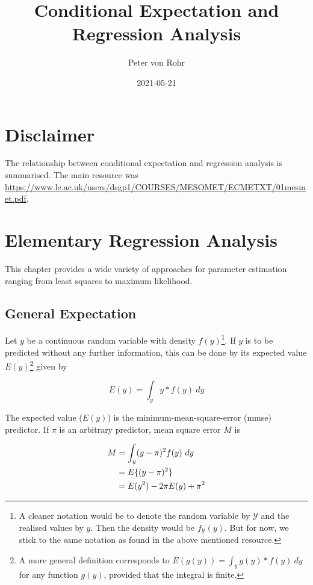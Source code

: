 \documentclass[]{tufte-handout}
\title{Conditional Expectation and Regression Analysis}
\author{Peter von Rohr}
\date{2021-05-21}
\begin{document}
\maketitle



{
\setcounter{tocdepth}{2}
\tableofcontents
}

\hypertarget{disclaimer}{%
\section{Disclaimer}\label{disclaimer}}

The relationship between conditional expectation and regression analysis is summarised. The main resource was \url{https://www.le.ac.uk/users/dsgp1/COURSES/MESOMET/ECMETXT/01mesmet.pdf}.

\hypertarget{elementary-regression-analysis}{%
\section{Elementary Regression Analysis}\label{elementary-regression-analysis}}

This chapter provides a wide variety of approaches for parameter estimation ranging from least squares to maximum likelihood.

\hypertarget{general-expectation}{%
\subsection{General Expectation}\label{general-expectation}}

Let \(y\) be a continuous random variable with density \(f(y)\)\footnote{A cleaner notation would be to denote the random variable by \(\mathcal{Y}\) and the realised values by \(y\). Then the density would be \(f_{\mathcal{Y}}(y)\). But for now, we stick to the same notation as found in the above mentioned resource.}. If \(y\) is to be predicted without any further information, this can be done by its expected value \(E(y)\)\footnote{A more general definition corresponds to \(E(g(y)) = \int_y g(y) * f(y)\ dy\) for any function \(g(y)\), provided that the integral is finite.} given by

\[E(y) = \int_y y * f(y)\ dy\]

The expected value (\(E(y)\)) is the minimum-mean-square-error (mmse) predictor. If \(\pi\) is an arbitrary predictor, mean square error \(M\) is

\begin{align}
M  &=  \int_y (y - \pi)^2 f(y)\ dy \notag \\
   &=  E\{(y - \pi)^2 \} \notag \\
   &=  E(y^2) - 2\pi E(y) + \pi^2
\label{eq:mmse}   
\end{align}
\end{document}

